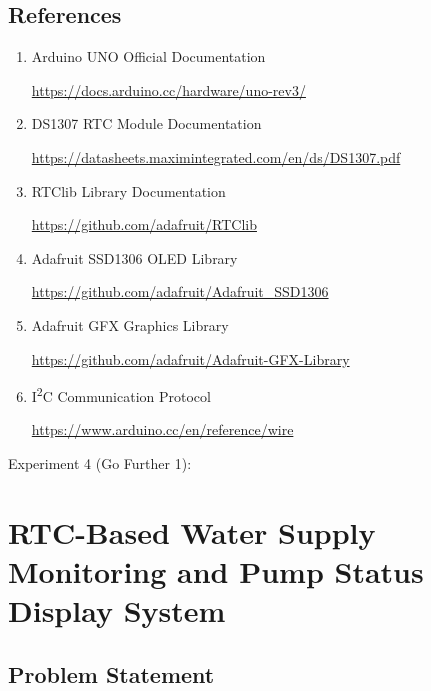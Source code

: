 
\subsection{References}

\begin{enumerate}

\item Arduino UNO Official Documentation

\url{https://docs.arduino.cc/hardware/uno-rev3/}

\item DS1307 RTC Module Documentation

\url{https://datasheets.maximintegrated.com/en/ds/DS1307.pdf}

\item RTClib Library Documentation

\url{https://github.com/adafruit/RTClib}

\item Adafruit SSD1306 OLED Library

\url{https://github.com/adafruit/Adafruit_SSD1306}

\item Adafruit GFX Graphics Library

\url{https://github.com/adafruit/Adafruit-GFX-Library}

\item I\textsuperscript{2}C Communication Protocol

\url{https://www.arduino.cc/en/reference/wire}

\end{enumerate}


\clearpage


\clearpage
Experiment 4 (Go Further 1):
\section{RTC-Based Water Supply Monitoring and Pump Status Display System}


\subsection{Problem Statement}

